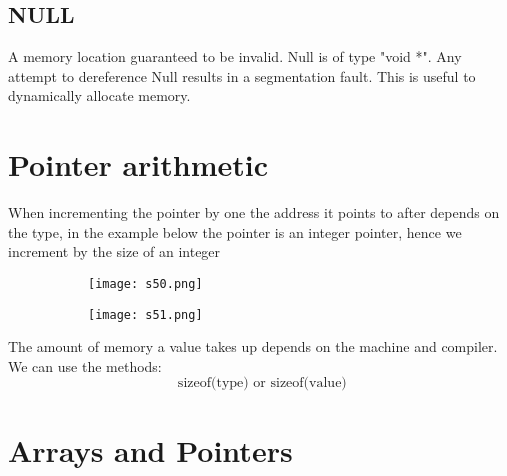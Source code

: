 \documentclass[8pt]{extreport}
\begin{document}
\subsection{NULL}

 A memory location guaranteed to be invalid. Null is of type "void *". Any attempt to dereference Null results in a segmentation fault. This is useful to dynamically allocate memory.


\section{Pointer arithmetic}
When incrementing the pointer by one the address it points to after depends on the type, in the example below the pointer is an integer pointer, hence we increment by the size of an integer
\begin{figure}[H]
\centering
\begin{subfigure}[b]{0.4\linewidth}
\texttt{[image: s50.png]}
\end{subfigure}
\begin{subfigure}[b]{0.4\linewidth}
\texttt{[image: s51.png]}
\end{subfigure}
\end{figure}

The amount of memory a value takes up depends on the machine and compiler. We can use the methods:
$$ \text{ sizeof(type)  or sizeof(value)} $$ 

\section{Arrays and Pointers}
\end{document}
